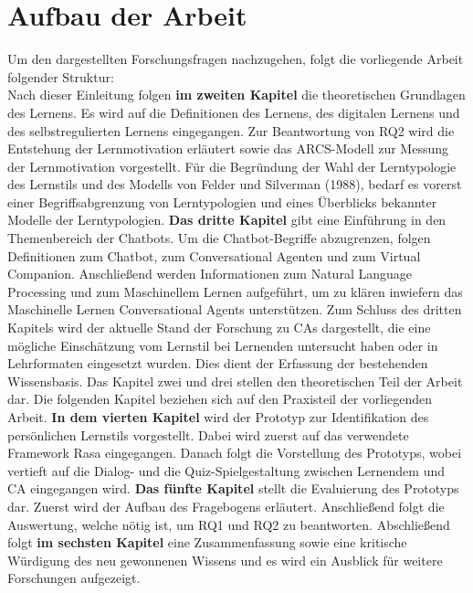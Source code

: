 \section{Aufbau der Arbeit}

Um den dargestellten Forschungsfragen nachzugehen, folgt die vorliegende Arbeit folgender Struktur:\\
Nach dieser Einleitung folgen \textbf{im 
zweiten Kapitel} die theoretischen Grundlagen des Lernens.
Es wird auf die Definitionen des Lernens, des digitalen Lernens und des selbstregulierten Lernens
eingegangen. Zur Beantwortung von RQ2 wird die Entstehung der Lernmotivation erläutert
sowie das ARCS-Modell zur Messung der Lernmotivation vorgestellt.
Für die Begründung der Wahl der Lerntypologie des Lernstils und des Modells von Felder und Silverman (1988), 
bedarf es vorerst einer Begriffsabgrenzung von Lerntypologien und eines Überblicks bekannter Modelle der Lerntypologien.
\textbf{Das dritte Kapitel} gibt eine Einführung in den Themenbereich der Chatbots.
Um die Chatbot-Begriffe abzugrenzen, folgen Definitionen  zum Chatbot,
zum Conversational Agenten
 und zum Virtual Companion.
Anschließend werden Informationen zum 
Natural Language Processing und zum Maschinellem Lernen aufgeführt, um 
zu klären inwiefern das Maschinelle Lernen Conversational Agents unterstützen. 
Zum Schluss des dritten Kapitels wird der aktuelle Stand der Forschung zu CAs dargestellt,
die eine mögliche Einschätzung vom Lernstil bei Lernenden untersucht haben oder in Lehrformaten
eingesetzt wurden. Dies dient der Erfassung der bestehenden Wissensbasis.
Das Kapitel zwei und drei stellen den theoretischen Teil der Arbeit dar. Die folgenden Kapitel
beziehen sich auf den Praxisteil der vorliegenden Arbeit.
\textbf{In dem vierten Kapitel} wird der Prototyp zur Identifikation des persönlichen Lernstils vorgestellt. 
Dabei wird zuerst auf das verwendete Framework Rasa eingegangen. Danach folgt die
Vorstellung des Prototyps, wobei vertieft auf 
die Dialog- und die Quiz-Spielgestaltung zwischen Lernendem und CA eingegangen wird.
\textbf{Das fünfte Kapitel} stellt die Evaluierung des Prototyps dar. 
Zuerst wird der Aufbau des Fragebogens erläutert. Anschließend folgt die Auswertung, welche nötig ist, um
RQ1 und RQ2 zu beantworten.
Abschließend folgt \textbf{im sechsten Kapitel} eine Zusammenfassung sowie 
eine kritische Würdigung des neu gewonnenen Wissens und
es wird ein Ausblick für weitere Forschungen aufgezeigt.

